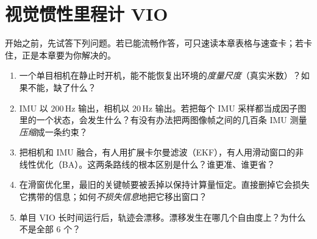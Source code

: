 \chapter{视觉惯性里程计 VIO}
\label{ch:vio}


\begin{practice}[前置自测]
开始之前，先试答下列问题。若已能流畅作答，可只速读本章表格与速查卡；若卡住，正是本章要为你解决的。
\begin{enumerate}
  \item 一个单目相机在静止时开机，能不能恢复出环境的\emph{度量尺度}（真实米数）？如果不能，缺了什么？
  \item IMU 以 $200\,$Hz 输出，相机以 $20\,$Hz 输出。若把每个 IMU 采样都当成因子图里的一个状态，会发生什么？有没有办法把两图像帧之间的几百条 IMU 测量\emph{压缩}成一条约束？
  \item 把相机和 IMU 融合，有人用扩展卡尔曼滤波（EKF），有人用滑动窗口的非线性优化（BA）。这两条路线的根本区别是什么？谁更准、谁更省？
  \item 在滑窗优化里，最旧的关键帧要被丢掉以保持计算量恒定。直接删掉它会损失它携带的信息；如何\emph{不损失信息}地把它移出窗口？
  \item 单目 VIO 长时间运行后，轨迹会漂移。漂移发生在哪几个自由度上？为什么不是全部 $6$ 个？
\end{enumerate}
\end{practice}

